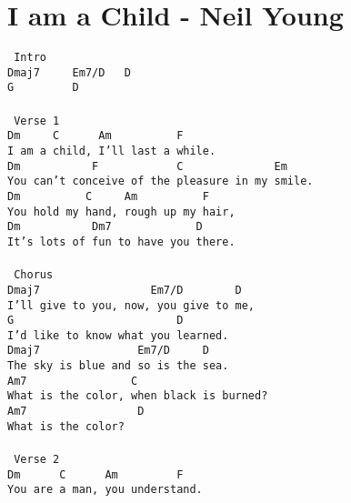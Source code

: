 \newpage
\section{I am a Child - Neil Young}
\label{I am a Child - Neil Young}
\texttt{\lbrack\ Intro\rbrack\ \\
Dmaj7\ \ \ \ \ Em7/D\ \ \ D\ \\
G\ \ \ \ \ \ \ \ \ D\ \\
\\
\lbrack\ Verse\ 1\rbrack\ \\
Dm\ \ \ \ \ C\ \ \ \ \ \ Am\ \ \ \ \ \ \ \ \ \ F\ \\
I\ am\ a\ child,\ I'll\ last\ a\ while.\ \\
Dm\ \ \ \ \ \ \ \ \ \ \ F\ \ \ \ \ \ \ \ \ \ \ \ C\ \ \ \ \ \ \ \ \ \ \ \ \ \ Em\ \\
You\ can't\ conceive\ of\ the\ pleasure\ in\ my\ smile.\ \\
Dm\ \ \ \ \ \ \ \ \ \ C\ \ \ \ \ Am\ \ \ \ \ \ \ \ \ \ F\ \\
You\ hold\ my\ hand,\ rough\ up\ my\ hair,\ \\
Dm\ \ \ \ \ \ \ \ \ \ \ Dm7\ \ \ \ \ \ \ \ \ \ \ \ \ D\ \\
It's\ lots\ of\ fun\ to\ have\ you\ there.\ \\
\\
\lbrack\ Chorus\rbrack\ \\
Dmaj7\ \ \ \ \ \ \ \ \ \ \ \ \ \ \ \ \ Em7/D\ \ \ \ \ \ \ \ D\ \\
I'll\ give\ to\ you,\ now,\ you\ give\ to\ me,\ \\
G\ \ \ \ \ \ \ \ \ \ \ \ \ \ \ \ \ \ \ \ \ \ \ \ \ D\ \\
I'd\ like\ to\ know\ what\ you\ learned.\ \\
Dmaj7\ \ \ \ \ \ \ \ \ \ \ \ \ \ \ Em7/D\ \ \ \ \ D\ \\
The\ sky\ is\ blue\ and\ so\ is\ the\ sea.\ \\
Am7\ \ \ \ \ \ \ \ \ \ \ \ \ \ \ \ C\ \\
What\ is\ the\ color,\ when\ black\ is\ burned?\ \\
Am7\ \ \ \ \ \ \ \ \ \ \ \ \ \ \ \ \ D\ \\
What\ is\ the\ color?\ \\
\\
\lbrack\ Verse\ 2\rbrack\\
Dm\ \ \ \ \ \ C\ \ \ \ \ \ Am\ \ \ \ \ \ \ \ \ F\ \\
You\ are\ a\ man,\ you\ understand.\ \\
}
